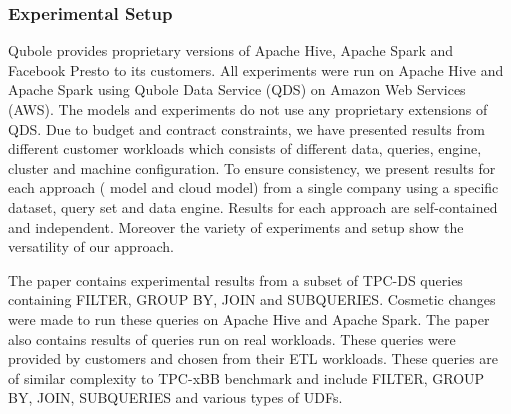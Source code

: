 \noindent\subsubsection*{Experimental Setup}
Qubole\cite{qubole} provides proprietary versions of Apache Hive\cite{thusoo2009hive}, Apache Spark\cite{zaharia2016apache} and Facebook Presto\cite{presto} to its customers.
All experiments were run on Apache Hive and Apache Spark using Qubole Data Service (QDS) on Amazon Web Services (AWS). 
The models and experiments do not use any proprietary extensions of QDS.  
Due to budget and contract constraints, we have presented results from different customer workloads which consists of different data, queries, engine, cluster and machine configuration.
To ensure consistency, we present results for each approach ( model and cloud model) from a single company using a specific dataset, query set and data engine. 
Results for each approach are self-contained and independent. Moreover the variety of experiments and setup show the versatility of our approach. 

The paper contains experimental results from a subset of TPC-DS\cite{poess2002tpc} queries containing FILTER, GROUP BY, JOIN and SUBQUERIES. Cosmetic changes were made to run these
queries on Apache Hive and Apache Spark. The paper also contains results of queries run on real workloads. These queries were provided by customers and chosen from their ETL workloads. These queries are of similar complexity to TPC-xBB benchmark\cite{nambiar2014benchmarking} and include FILTER, GROUP BY, JOIN, SUBQUERIES and various types of UDFs.

